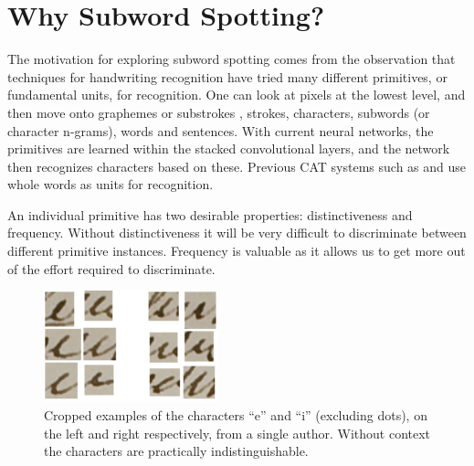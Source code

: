 \documentclass[ms,electronic,twosidetoc,letterpaper,chaptercenter,parttop,lof,lot]{byumsphd}
\begin{document}

\section{Why Subword Spotting?}

The motivation for exploring subword spotting comes from the observation that techniques for handwriting recognition have tried many different primitives, or fundamental units, for recognition. One can look at pixels at the lowest level, and then move onto graphemes or substrokes \cite{liang2012}, strokes, characters, subwords (or character n-grams), words and sentences. With current neural networks, the primitives are learned within the stacked convolutional layers, and the network then recognizes characters based on these. Previous CAT systems such as \cite{Clawson2014} and \cite{Zagoris2015} use whole words as units for recognition. 



An individual primitive has two desirable properties: distinctiveness and frequency. Without distinctiveness it will be very difficult to discriminate between different primitive instances. Frequency is valuable as it allows us to get more out of the effort required to discriminate. %

\begin{figure}
    \centering
    \includegraphics[width=0.45\textwidth]{ei}
    \caption{Cropped examples of the characters ``e'' and ``i'' (excluding dots), on the left and right respectively, from a single author. Without context the characters are practically indistinguishable.}
    \label{fig:ei}
\end{figure}
\end{document}
